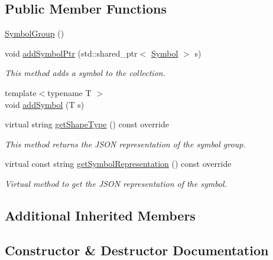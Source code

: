 \subsection*{Public Member Functions}
\begin{DoxyCompactItemize}
\item 
\hyperlink{classbridges_1_1datastructure_1_1_symbol_group_abe55fe5fa0577b2a8d507f8f2303d5f7}{Symbol\+Group} ()
\item 
void \hyperlink{classbridges_1_1datastructure_1_1_symbol_group_a6c75691b342e5fbc3b73a0278376783e}{add\+Symbol\+Ptr} (std\+::shared\+\_\+ptr$<$ \hyperlink{classbridges_1_1datastructure_1_1_symbol}{Symbol} $>$ s)
\begin{DoxyCompactList}\small\item\em This method adds a symbol to the collection. \end{DoxyCompactList}\item 
{\footnotesize template$<$typename T $>$ }\\void \hyperlink{classbridges_1_1datastructure_1_1_symbol_group_a65fb3f9d9fe65503173b6529246f9ee8}{add\+Symbol} (T s)
\item 
virtual string \hyperlink{classbridges_1_1datastructure_1_1_symbol_group_a64dfd163d201b6759b1d21f90584e670}{get\+Shape\+Type} () const override
\begin{DoxyCompactList}\small\item\em This method returns the J\+S\+ON representation of the symbol group. \end{DoxyCompactList}\item 
virtual const string \hyperlink{classbridges_1_1datastructure_1_1_symbol_group_af3a4109c7a19314a611e879cb2b0aeca}{get\+Symbol\+Representation} () const override
\begin{DoxyCompactList}\small\item\em Virtual method to get the J\+S\+ON representation of the symbol. \end{DoxyCompactList}\end{DoxyCompactItemize}
\subsection*{Additional Inherited Members}


\subsection{Constructor \& Destructor Documentation}
\mbox{\label{classbridges_1_1datastructure_1_1_symbol_group_abe55fe5fa0577b2a8d507f8f2303d5f7}} 
